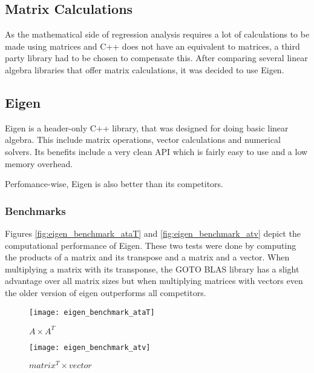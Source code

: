 \subsection{Matrix Calculations}

As the mathematical side of regression analysis requires a lot of calculations to be made using matrices and C++ does not have an equivalent to matrices, a third party library had to be chosen to compensate this. After comparing several linear algebra libraries that offer matrix calculations, it was decided to use Eigen.

\subsection{Eigen}

Eigen is a header-only C++ library, that was designed for doing basic linear algebra. This include matrix operations, vector calculations and numerical solvers. Its benefits include a very clean API which is fairly easy to use and a low memory overhead.

Perfomance-wise, Eigen is also better than its competitors.

\subsubsection{Benchmarks}

Figures \vref{fig:eigen_benchmark_ataT} and \vref{fig:eigen_benchmark_atv} depict the computational performance of Eigen. These two tests were done by computing the products of a matrix and its transpose and a matrix and a vector. When multiplying a matrix with its transponse, the GOTO BLAS library has a slight advantage over all matrix sizes but when multiplying matrices with vectors even the older version of eigen outperforms all competitors.

\begin{figure}[!htb]
    \centering
    \texttt{[image: eigen\_benchmark\_ataT]}
    \caption{$ A \times A^T $ \autocite{EigenBenchmark}}
    \label{fig:eigen_benchmark_ataT}
\end{figure}

\begin{figure}[!htb]
    \centering
    \texttt{[image: eigen\_benchmark\_atv]}
    \caption{$ matrix^T \times vector $ \autocite{EigenBenchmark}}
    \label{fig:eigen_benchmark_atv}
\end{figure}

